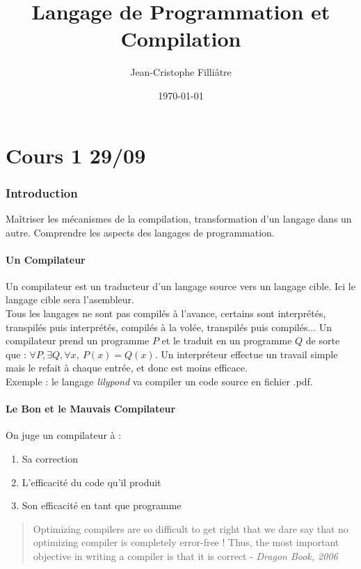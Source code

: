\documentclass{cours}
\title{Langage de Programmation et Compilation}
\author{Jean-Cristophe Filliâtre}
\date{\today}
\begin{document}
\part{Cours 1 29/09}
\section*{Introduction}
Maîtriser les mécanismes de la compilation, transformation d'un langage dans un autre. Comprendre les aspects des langages de programmation.\\
\subsection{Un Compilateur}
Un compilateur est un traducteur d'un langage source vers un langage cible. Ici le langage cible sera l'asembleur. \\
Tous les langages ne sont pas compilés à l'avance, certains sont interprétés, transpilés puis interprétés, compilés à la volée, transpilés puis compilés...
Un compilateur prend un programme $P$ et le traduit en un programme $Q$ de sorte que : $\forall P, \exists Q, \forall x, \ P(x) = Q(x)$. Un interpréteur effectue un travail simple mais le refait à chaque entrée, et donc est moins efficace.\\
Exemple : le langage \textsl{lilypond} va compiler un code source en fichier .pdf. \\

\subsection{Le Bon et le Mauvais Compilateur}
On juge un compilateur à : \begin{enumerate}
    \item Sa correction
    \item L'efficacité du code qu'il produit
    \item Son efficacité en tant que programme
\end{enumerate}
\begin{quote}
    \og Optimizing compilers are so difficult to get right that we dare say that no optimizing compiler is completely error-free ! Thus, the most important objective in writing a compiler is that it is correct \fg - \textit{Dragon Book, 2006}
\end{quote}
\end{document}

